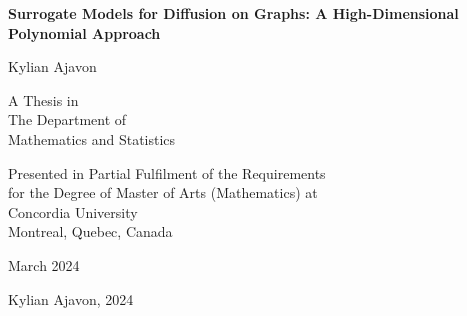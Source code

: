 \documentclass[12pt, oneside]{report}   	%
\makeatletter
\newcommand\frontmatter{%
    \cleardoublepage
  \pagenumbering{roman}}
\makeatother
\begin{document}
\frontmatter

\begin{titlepage}
\thispagestyle{empty}
\centering
{\Huge\bfseries Surrogate Models for Diffusion on Graphs: A High-Dimensional Polynomial Approach\par}
\vspace{2cm}
{\Large Kylian Ajavon\par}
\vspace{2cm}
{\Large A Thesis in \\
The Department of \\
Mathematics and Statistics\par}
\vspace{2cm}
{\Large Presented in Partial Fulfilment of the Requirements \\
for the Degree of Master of Arts (Mathematics) at \\
Concordia University \\
Montreal, Quebec, Canada\par}
\vfill
{\large March 2024\par}
\vspace{1cm}
\textcopyright \; Kylian Ajavon, 2024
\end{titlepage}

\end{document}

